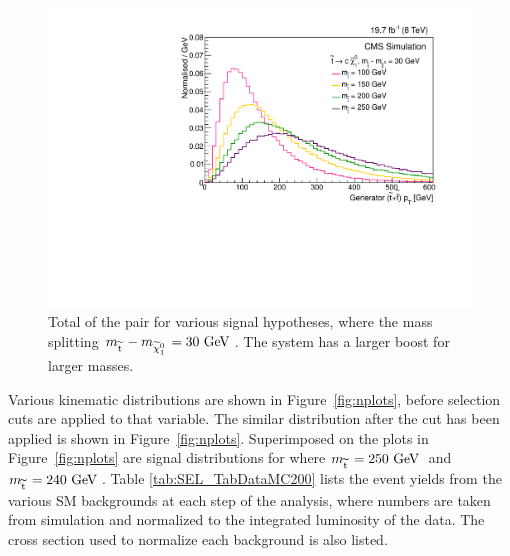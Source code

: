 \begin{figure}%
  \begin{center}
  \includegraphics[scale=0.45]{Figures/sus13009/stopstoppt.pdf}
  \caption{Total \pt of the \sTop\santiTop{} pair for various signal hypotheses, where the mass splitting $m_{\widetilde{{\rm t}}\,}-m_{\widetilde{\chi}^{0}_{1}\,} = 30~\mathrm{GeV}\,$. The \sTop\santiTop{} system has a larger boost for larger \sTop masses.
         \label{stopstoppT}}
  \end{center}
\end{figure}


Various kinematic distributions are shown in Figure~\ref{fig:nplots}, before selection cuts are applied to that variable.
The similar distribution after the cut has been applied is shown in Figure~\ref{fig:nplots}.
Superimposed on the plots in Figure~\ref{fig:nplots} are signal distributions for \ttwocc where $m_{\widetilde{{\rm t}}\,} = 250~\mathrm{GeV}\,$ and $m_{\widetilde{{\rm t}}\,} = 240~\mathrm{GeV}\,$.
Table \ref{tab:SEL_TabDataMC200} lists the event yields from the various \ac{SM} backgrounds at each step of the analysis, where numbers are taken from simulation and normalized to the integrated luminosity of the data. The cross section used to normalize each background is also listed.

